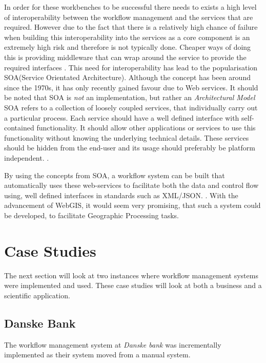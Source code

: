 \documentclass[11pt,twocolumn]{article}
\begin{document}
    In order for these workbenches to be successful there needs
    to exists a high level of interoperability between the
    workflow management and the services that are required.
    However due to the fact that there is a relatively high
    chance of failure when building this interoperability into the
    services as a core component is an extremely high risk
    and therefore is not typically done. Cheaper ways of
    doing this is providing middleware that can wrap around
    the service to provide the required interfaces
    \cite{Shegalov:2001:XWM:767132.767139}.
    This need for interoperability has lead to the
    popularisation SOA(Service Orientated Architecture).
    Although the concept has been around since the 1970s,
    it has only recently gained favour due to Web services.
    It should be noted that SOA is \emph{not} an implementation,
    but rather an \emph{Architectural Model}
    SOA refers to a collection of loosely coupled services,
    that individually carry out a particular process. Each
    service should have a well defined interface with self-contained
    functionality. It should allow other applications
    or services to use this functionality without knowing
    the underlying technical details. These services should be
    hidden from the end-user and its usage should preferably
    be platform independent.
    \cite{Sanders:2008:SSA:1400549.1400595}.

    By using the concepts from SOA, a workflow system can
    be built that automatically uses these web-services
    to facilitate both the data and control flow using,
    well defined interfaces in standards such as XML/JSON.
    \cite{Shegalov:2001:XWM:767132.767139}. With the
    advancement of WebGIS, it would seem very promising,
    that such a system could be developed, to facilitate
    Geographic Processing tasks.


\section{Case Studies}
    The next section will look at two instances where
    workflow management systems were implemented and used.
    These case studies will look at both a business and a
    scientific application.
    \subsection*{Danske Bank}
      The workflow management system at \emph{Danske bank} was
      incrementally implemented as their system moved
      from a manual system.
\end{document}
